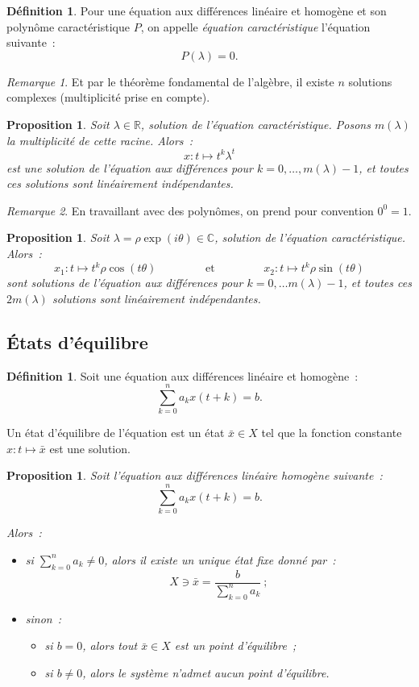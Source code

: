 \documentclass{article}
\newtheorem{prp}[thm]{Proposition}
\theoremstyle{definition}
\newtheorem{déf}[thm]{Définition}
\theoremstyle{remark}
\newtheorem*{rmq}{Remarque}
\newcommand{\R}{\mathbb R}
\newcommand{\C}{\mathbb C}
\begin{document}
	\begin{déf} Pour une équation aux différences linéaire et homogène et son polynôme caractéristique $P$, on appelle \textit{équation caractéristique}
	l'équation suivante~:
	\[P(\lambda) = 0.\]
	\end{déf}

	\begin{rmq} Et par le théorème fondamental de l'algèbre, il existe $n$ solutions complexes (multiplicité prise en compte).
	\end{rmq}

	\begin{prp} Soit $\lambda \in \R$, solution de l'équation caractéristique. Posons $m(\lambda)$ la multiplicité de cette racine. Alors~:
	\[x : t \mapsto t^k\lambda^t\]
	est une solution de l'équation aux différences pour $k = 0, \ldots, m(\lambda)-1$, et toutes ces solutions sont linéairement indépendantes.
	\end{prp}

	\begin{rmq} En travaillant avec des polynômes, on prend pour convention $0^0 = 1$.
	\end{rmq}

	\begin{prp} Soit $\lambda = \rho\exp(i\theta) \in \C$, solution de l'équation caractéristique. Alors~:
	\[x_1 : t \mapsto t^k\rho\cos(t\theta) \qquad\qquad \text{ et } \qquad\qquad x_2 : t \mapsto t^k\rho\sin(t\theta)\]
	sont solutions de l'équation aux différences pour $k = 0, \ldots m(\lambda)-1$, et toutes ces $2m(\lambda)$ solutions sont linéairement indépendantes.
	\end{prp}

	\subsection{États d'équilibre}

	\begin{déf} Soit une équation aux différences linéaire et homogène~:
	\[\sum_{k=0}^na_kx(t+k) = b.\]

	Un état d'équilibre de l'équation est un état $\bar x \in X$ tel que la fonction constante $x : t \mapsto \bar x$ est une solution.
	\end{déf}

	\begin{prp} Soit l'équation aux différences linéaire homogène suivante~:
	\[\sum_{k=0}^na_kx(t+k) = b.\]

	Alors~:
	\begin{itemize}
		\item si $\sum_{k=0}^na_k \neq 0$, alors il existe un unique état fixe donné par~:
		\[X \ni \bar x = \frac b{\sum_{k=0}^na_k}~;\]
		\item sinon~:
		\begin{itemize}
			\item si $b = 0$, alors tout $\bar x \in X$ est un point d'équilibre~;
			\item si $b \neq 0$, alors le système n'admet aucun point d'équilibre.
		\end{itemize}
	\end{itemize}
	\end{prp}
\end{document}
